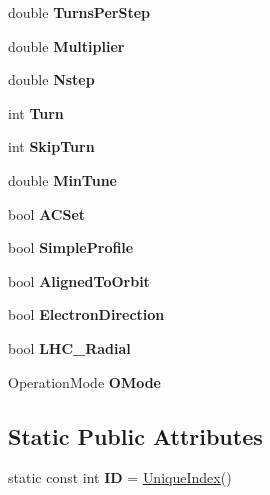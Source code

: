 \begin{DoxyCompactItemize}
double {\bfseries Turns\+Per\+Step}
\item 
\mbox{\label{classHollowElectronLens_addd07b0ada6341a3756003145a022000}} 
double {\bfseries Multiplier}
\item 
\mbox{\label{classHollowElectronLens_a8b12683fa0711bafdd3632790556dc45}} 
double {\bfseries Nstep}
\item 
\mbox{\label{classHollowElectronLens_ad5d8fbd840881a7c99ac04e733b55b66}} 
int {\bfseries Turn}
\item 
\mbox{\label{classHollowElectronLens_a4719ae32d91f557c92fab6d609266fbd}} 
int {\bfseries Skip\+Turn}
\item 
\mbox{\label{classHollowElectronLens_a0ae6a3422bc61ae8b57090265e307af0}} 
double {\bfseries Min\+Tune}
\item 
\mbox{\label{classHollowElectronLens_adf2debc8bd3054569a8f1f2e73e4e007}} 
bool {\bfseries A\+C\+Set}
\item 
\mbox{\label{classHollowElectronLens_a9981fa74ecedfca0564ab54141755ef3}} 
bool {\bfseries Simple\+Profile}
\item 
\mbox{\label{classHollowElectronLens_a955b1dda0acae56774e27ea830c7e985}} 
bool {\bfseries Aligned\+To\+Orbit}
\item 
\mbox{\label{classHollowElectronLens_a3ae333d82b7a4c825d38c08aef2271a0}} 
bool {\bfseries Electron\+Direction}
\item 
\mbox{\label{classHollowElectronLens_a65fc620810eb1a9db90bed09f8335eb2}} 
bool {\bfseries L\+H\+C\+\_\+\+Radial}
\item 
\mbox{\label{classHollowElectronLens_a68219b515df6a1b42032f39779aaf1fd}} 
Operation\+Mode {\bfseries O\+Mode}
\end{DoxyCompactItemize}
\subsection*{Static Public Attributes}
\begin{DoxyCompactItemize}
\item 
\mbox{\label{classHollowElectronLens_ab3a62945c35f95d17922e9f9ea5216f7}} 
static const int {\bfseries ID} = \hyperlink{classAcceleratorComponent_aa7ad4d39e1a488b705983842ed1ac784}{Unique\+Index}()
\end{DoxyCompactItemize}
